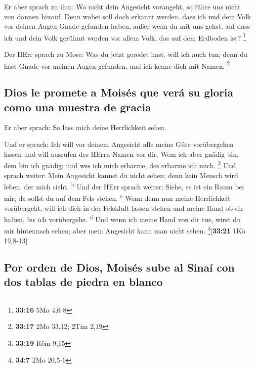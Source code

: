  Er aber sprach zu ihm: Wo nicht dein Angesicht
vorangeht, so führe uns nicht von dannen hinauf.  Denn
wobei soll doch erkannt werden, dass ich und dein Volk vor deinen Augen
Gnade gefunden haben, außer wenn du mit uns gehst, auf dass ich und dein
Volk gerühmt werden vor allem Volk, das auf dem Erdboden ist?
\footnote{\textbf{33:16} 5Mo 4,6-8}

 Der HErr sprach zu Mose: Was du jetzt geredet hast, will
ich auch tun; denn du hast Gnade vor meinen Augen gefunden, und ich
kenne dich mit Namen. \footnote{\textbf{33:17} 2Mo 33,12; 2Tim 2,19}

\hypertarget{dios-le-promete-a-moisuxe9s-que-veruxe1-su-gloria-como-una-muestra-de-gracia}{%
\subsection{Dios le promete a Moisés que verá su gloria como una muestra
de
gracia}\label{dios-le-promete-a-moisuxe9s-que-veruxe1-su-gloria-como-una-muestra-de-gracia}}

 Er aber sprach: So lass mich deine Herrlichkeit sehen.

 Und er sprach: Ich will vor deinem Angesicht alle meine
Güte vorübergehen lassen und will ausrufen des HErrn Namen vor dir. Wem
ich aber gnädig bin, dem bin ich gnädig; und wes ich mich erbarme, des
erbarme ich mich. \footnote{\textbf{33:19} Röm 9,15}  Und
sprach weiter: Mein Angesicht kannst du nicht sehen; denn kein Mensch
wird leben, der mich sieht. \textsuperscript{b}  Und der
HErr sprach weiter: Siehe, es ist ein Raum bei mir; da sollst du auf dem
Fels stehen. \textsuperscript{c}  Wenn denn nun meine
Herrlichkeit vorübergeht, will ich dich in der Felskluft lassen stehen
und meine Hand ob dir halten, bis ich vorübergehe. \textsuperscript{d}
 Und wenn ich meine Hand von dir tue, wirst du mir
hintennach sehen; aber mein Angesicht kann man nicht sehen.
\footnote{\textbf{34:7} 2Mo 20,5-6}{[}\textbf{33:21} 1Kö 19,8-13{]}

\hypertarget{por-orden-de-dios-moisuxe9s-sube-al-sinauxed-con-dos-tablas-de-piedra-en-blanco}{%
\subsection{Por orden de Dios, Moisés sube al Sinaí con dos tablas de
piedra en
blanco}\label{por-orden-de-dios-moisuxe9s-sube-al-sinauxed-con-dos-tablas-de-piedra-en-blanco}}

